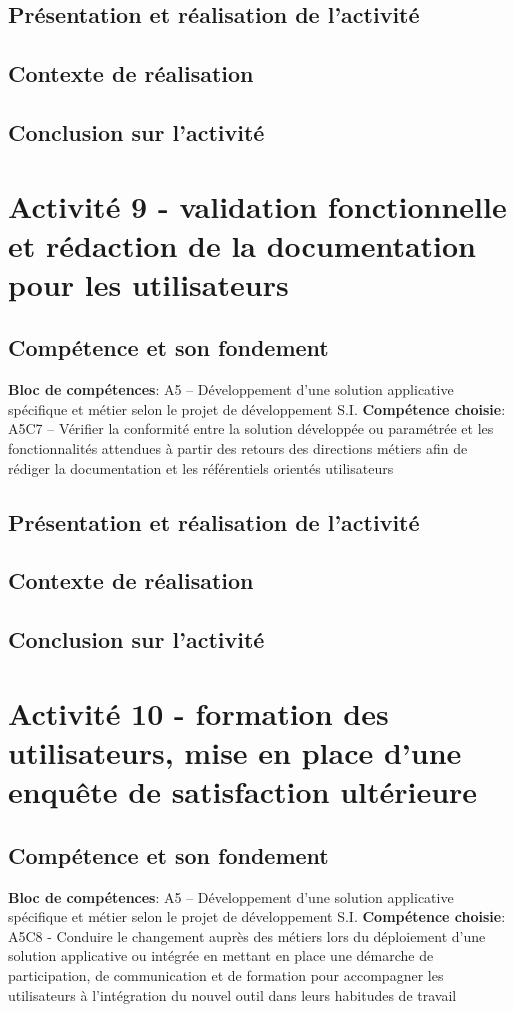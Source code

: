 \documentclass[a4paper, 11pt]{report}
\begin{document}
\subsection{Présentation et réalisation de l'activité}
\subsection{Contexte de réalisation}
\subsection{Conclusion sur l'activité}

\section{Activité 9 - validation fonctionnelle et rédaction de la documentation pour les utilisateurs}
\subsection{Compétence et son fondement}
\textbf{Bloc de compétences}: A5 – Développement d’une solution applicative spécifique et métier selon le projet de développement S.I.
\newline
\textbf{Compétence choisie}: A5C7 – Vérifier la conformité entre la solution développée ou paramétrée et les fonctionnalités attendues à partir des retours des directions métiers afin de rédiger la documentation et les référentiels orientés utilisateurs
\subsection{Présentation et réalisation de l'activité}
\subsection{Contexte de réalisation}
\subsection{Conclusion sur l'activité}

\section{Activité 10 - formation des utilisateurs, mise en place d’une enquête de satisfaction ultérieure}
\subsection{Compétence et son fondement}
\textbf{Bloc de compétences}: A5 – Développement d’une solution applicative spécifique et métier selon le projet de développement S.I.
\newline
\textbf{Compétence choisie}: A5C8 - Conduire le changement auprès des métiers lors du déploiement d’une solution applicative ou intégrée en mettant en place une démarche de participation, de communication et de formation pour accompagner les utilisateurs à l’intégration du nouvel outil dans leurs habitudes de travail
\end{document}
